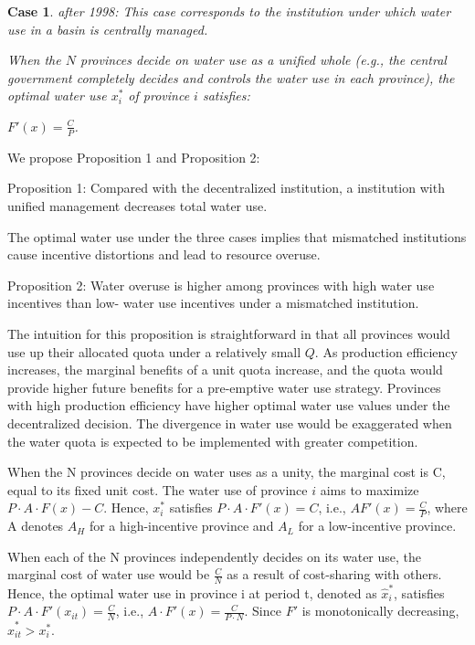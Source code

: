 \documentclass[preprint, 12pt]{elsarticle}
\newtheorem{case}{Case}
\begin{document}
\begin{case} after 1998: This case corresponds to the institution under which water use in a basin is centrally managed.

 When the $N$ provinces decide on water use as a unified whole (e.g., the central government completely decides and controls the water use in each province), the optimal water use $x_i^*$ of province $i$ satisfies:

$F'(x)=\frac{C}{P}$.

\end{case}

We propose Proposition 1 and Proposition 2:

Proposition 1: Compared with the decentralized institution, a institution with unified management decreases total water use.

The optimal water use under the three cases implies that mismatched institutions cause incentive distortions and lead to resource overuse.


Proposition 2: Water overuse is higher among provinces with high water use incentives than low- water use incentives under a mismatched institution.

The intuition for this proposition is straightforward in that all provinces would use up their allocated quota under a relatively small $Q$. As production efficiency increases, the marginal benefits of a unit quota increase, and the quota would provide higher future benefits for a pre-emptive water use strategy. Provinces with high production efficiency have higher optimal water use values under the decentralized decision. The divergence in water use would be exaggerated when the water quota is expected to be implemented with greater competition.





When the N provinces decide on water uses as a unity, the marginal cost is C, equal to its fixed unit cost.
The water use of province $i$ aims to maximize $P\cdot A\cdot F(x)-C$.
Hence, $x_i^*$ satisfies $P \cdot A\cdot F'(x)=C$, i.e., $AF'(x)=\frac{C}{P}$, where A denotes $A_H$ for a high-incentive province and $A_L$ for a low-incentive province.

When each of the N provinces independently decides on its water use, the marginal cost of water use would be $\frac{C}{N}$ as a result of cost-sharing with others.
Hence, the optimal water use in province i at period t, denoted as $\hat x_i^*$, satisfies $P \cdot A \cdot F'(x_{it})=\frac{C}{N}$, i.e., $A \cdot F'(x)=\frac{C}{P \cdot N}$.
Since $F'$ is monotonically decreasing, $\hat x_{it}^*>x_i^*$.
\end{document}
